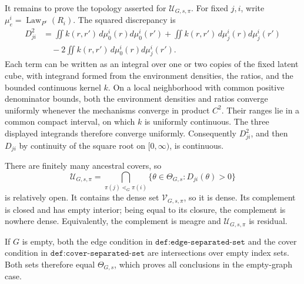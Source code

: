 It remains to prove the topology asserted for \(\mathcal U_{G,s,\pi}\). For fixed \(j,i\), write \(\mu_e^i=\operatorname{Law}_{P^e}(R_i)\). The squared discrepancy is
\[
\begin{aligned}
 D_{ji}^2
 &=\iint k(r,r')\,d\mu_0^i(r)d\mu_0^i(r')
   +\iint k(r,r')\,d\mu_j^i(r)d\mu_j^i(r')\\
 &\quad-2\iint k(r,r')\,d\mu_0^i(r)d\mu_j^i(r').
\end{aligned}
\]
Each term can be written as an integral over one or two copies of the fixed latent cube, with integrand formed from the environment densities, the ratios, and the bounded continuous kernel \(k\). On a local neighborhood with common positive denominator bounds, both the environment densities and ratios converge uniformly whenever the mechanisms converge in product \(C^2\). Their ranges lie in a common compact interval, on which \(k\) is uniformly continuous. The three displayed integrands therefore converge uniformly. Consequently \(D_{ji}^2\), and then \(D_{ji}\) by continuity of the square root on \([0,\infty)\), is continuous.

There are finitely many ancestral covers, so
\[
 \mathcal U_{G,s,\pi}
 =\bigcap_{\pi(j)\lessdot_G\pi(i)}
   \{\theta\in\Theta_{G,s}:D_{ji}(\theta)>0\}
\]
is relatively open. It contains the dense set \(\mathcal V_{G,s,\pi}\), so it is dense. Its complement is closed and has empty interior; being equal to its closure, the complement is nowhere dense. Equivalently, the complement is meagre and \(\mathcal U_{G,s,\pi}\) is residual.

If \(G\) is empty, both the edge condition in \(\texttt{def:edge-separated-set}\) and the cover condition in \(\texttt{def:cover-separated-set}\) are intersections over empty index sets. Both sets therefore equal \(\Theta_{G,s}\), which proves all conclusions in the empty-graph case.
